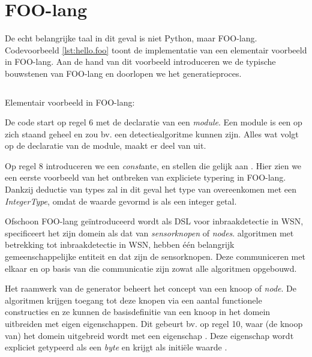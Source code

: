 
\section{FOO-lang}
\label{section:devel-foo-lang}

De echt belangrijke taal in dit geval is niet Python, maar FOO-lang.
Codevoorbeeld \ref{lst:hello.foo} toont de implementatie van een elementair
voorbeeld in FOO-lang. Aan de hand van dit voorbeeld introduceren we de
typische bouwstenen van FOO-lang en doorlopen we het generatieproces.

\begin{listing}[ht]
  \inputminted[linenos,frame=lines,framesep=2mm,fontsize=\footnotesize]{js}{../src/foo-lang/examples/hello.foo}
  \vspace{-3mm}
  \caption{Elementair voorbeeld in FOO-lang: }
  \label{lst:hello.foo}
\end{listing}

De code start op regel 6 met de declaratie van een \emph{module}. Een module is
een op zich staand geheel en zou bv. een detectiealgoritme kunnen zijn. Alles
wat volgt op de declaratie van de module, maakt er deel van uit.

Op regel 8 introduceren we een \emph{const}ante,  en stellen die
gelijk aan . Hier zien we een eerste voorbeeld van het ontbreken van
expliciete typering in FOO-lang. Dankzij deductie van types zal in dit geval
het type van  overeenkomen met een \emph{IntegerType}, omdat de
waarde  gevormd is als een integer getal.

Ofschoon FOO-lang ge\"introduceerd wordt als DSL voor inbraakdetectie in WSN,
specificeert het zijn domein als dat van \emph{sensorknopen} of \emph{nodes}.
algoritmen met betrekking tot inbraakdetectie in WSN, hebben \'e\'en belangrijk
gemeenschappelijke entiteit en dat zijn de sensorknopen. Deze communiceren met
elkaar en op basis van die communicatie zijn zowat alle algoritmen opgebouwd.

Het raamwerk van de generator beheert het concept van een knoop of \emph{node}.
De algoritmen krijgen toegang tot deze knopen via een aantal functionele
constructies en ze kunnen de basisdefinitie van een knoop in het domein
uitbreiden met eigen eigenschappen. Dit gebeurt bv. op regel 10, waar (de knoop
van) het domein uitgebreid wordt met een eigenschap . Deze
eigenschap wordt expliciet getypeerd als een \emph{byte} en krijgt als
initi\"ele waarde .

